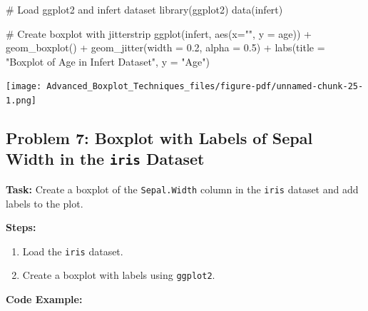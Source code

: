 \documentclass[
  letterpaper,
  DIV=11,
  numbers=noendperiod]{scrreprt}
\newenvironment{Shaded}{\begin{snugshade}}{\end{snugshade}}
\newcommand{\AttributeTok}[1]{\textcolor[rgb]{0.40,0.45,0.13}{#1}}
\newcommand{\CommentTok}[1]{\textcolor[rgb]{0.37,0.37,0.37}{#1}}
\newcommand{\FloatTok}[1]{\textcolor[rgb]{0.68,0.00,0.00}{#1}}
\newcommand{\FunctionTok}[1]{\textcolor[rgb]{0.28,0.35,0.67}{#1}}
\newcommand{\NormalTok}[1]{\textcolor[rgb]{0.00,0.23,0.31}{#1}}
\newcommand{\SpecialCharTok}[1]{\textcolor[rgb]{0.37,0.37,0.37}{#1}}
\newcommand{\StringTok}[1]{\textcolor[rgb]{0.13,0.47,0.30}{#1}}
\providecommand{\tightlist}{%
  \setlength{\itemsep}{0pt}\setlength{\parskip}{0pt}}\usepackage{longtable,booktabs,array}
\begin{document}
\begin{Shaded}
\begin{Highlighting}[]
\CommentTok{\# Load ggplot2 and infert dataset}
\FunctionTok{library}\NormalTok{(ggplot2)}
\FunctionTok{data}\NormalTok{(infert)}

\CommentTok{\# Create boxplot with jitterstrip}
\FunctionTok{ggplot}\NormalTok{(infert, }\FunctionTok{aes}\NormalTok{(}\AttributeTok{x=}\StringTok{""}\NormalTok{, }\AttributeTok{y =}\NormalTok{ age)) }\SpecialCharTok{+}
  \FunctionTok{geom\_boxplot}\NormalTok{() }\SpecialCharTok{+}
  \FunctionTok{geom\_jitter}\NormalTok{(}\AttributeTok{width =} \FloatTok{0.2}\NormalTok{, }\AttributeTok{alpha =} \FloatTok{0.5}\NormalTok{) }\SpecialCharTok{+}
  \FunctionTok{labs}\NormalTok{(}\AttributeTok{title =} \StringTok{"Boxplot of Age in Infert Dataset"}\NormalTok{, }\AttributeTok{y =} \StringTok{"Age"}\NormalTok{)}
\end{Highlighting}
\end{Shaded}

\texttt{[image: Advanced\_Boxplot\_Techniques\_files/figure-pdf/unnamed-chunk-25-1.png]}

\subsection*{\texorpdfstring{Problem 7: Boxplot with Labels of Sepal
Width in the \texttt{iris}
Dataset}{Problem 7: Boxplot with Labels of Sepal Width in the iris Dataset}}\label{problem-7-boxplot-with-labels-of-sepal-width-in-the-iris-dataset}

\textbf{Task:} Create a boxplot of the \texttt{Sepal.Width} column in
the \texttt{iris} dataset and add labels to the plot.

\textbf{Steps:}

\begin{enumerate}
\def\labelenumi{\arabic{enumi}.}
\tightlist
\item
  Load the \texttt{iris} dataset.
\item
  Create a boxplot with labels using \texttt{ggplot2}.
\end{enumerate}

\textbf{Code Example:}
\end{document}
